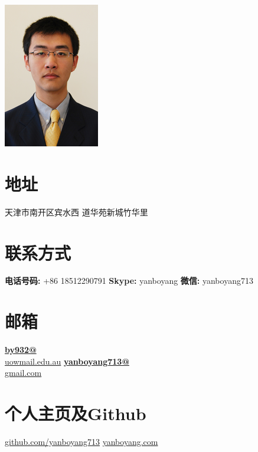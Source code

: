 \documentclass[]{friggeri-cv}
\begin{document}



\begin{aside}
  \includegraphics[scale=0.07]{img/boyang.png}
  \section{地址}
  天津市南开区宾水西
  道华苑新城竹华里
    ~
    \section{联系方式}
    \textbf{电话号码:} +86 18512290791
    \textbf{Skype:} yanboyang
    \textbf{微信:} yanboyang713
    ~
    \section{邮箱}
    \href{mailto:by932@uowmail.edu.au}{\textbf{by932@}\\uowmail.edu.au}
    \href{mailto:yanboyang713@gmail.com}{\textbf{yanboyang713@}\\gmail.com}
    ~
    \section{个人主页及Github}
    \href{https://github.com/yanboyang713}{github.com/yanboyang713}
    \href{http://www.yanboyang.com}{yanboyang.com}
    ~

\end{aside}
\end{document}
